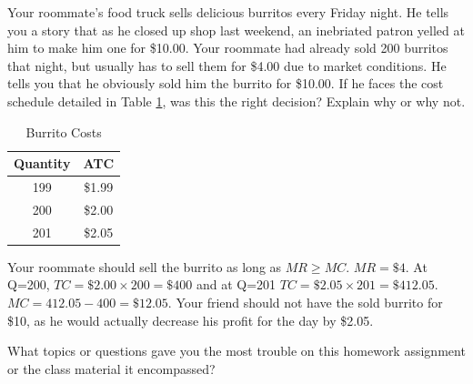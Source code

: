 \documentclass[addpoints,11pt]{exam}
\theoremstyle{definition}
\begin{document}
\begin{questions}
			
		\question[4] Your roommate's food truck sells delicious burritos every Friday night. He tells you a story that as he closed up shop last weekend, an inebriated patron yelled at him to make him one for \$10.00. Your roommate had already sold 200 burritos that night, but usually has to sell them for \$4.00 due to market conditions. He tells you that he obviously sold him the burrito for \$10.00. If he faces the cost schedule detailed in Table \ref{tab5}, was this the right decision? Explain why or why not. 
			
			
			\begin{table}[H]
				\caption{Burrito Costs}
				\centering
				\begin{tabular}{ c|c}        
					
					Quantity  & ATC \\
					\hline
					199 & \$1.99 \\
					200 & \$2.00 \\
					201 & \$2.05 \\
				\end{tabular}
				\label{tab5}
			\end{table}
			
			\begin{solution}
				Your roommate should sell the burrito as long as $MR \ge MC$. $MR = \$4.$ At Q=200, $TC = \$2.00 \times 200 = \$400$ and at Q=201 $TC = \$2.05 \times 201 = \$412.05.$ $MC = 412.05 - 400 = \$12.05$. Your friend should not have the sold burrito for \$10, as he would actually decrease his profit for the day by \$2.05.
			\end{solution}
		
		
	\question What topics or questions gave you the most trouble on this homework assignment or the class material it encompassed? 
			
\end{questions}
\end{document}
